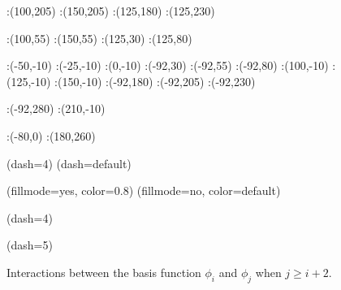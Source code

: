 {\begin{figure}[h]
:(100,205) :(150,205)
:(125,180) :(125,230)

:(100,55) :(150,55)
:(125,30) :(125,80)

:(-50,-10) :(-25,-10) :(0,-10) 
:(-92,30) :(-92,55) :(-92,80) 
:(100,-10) :(125,-10) :(150,-10) 
:(-92,180) :(-92,205) :(-92,230) 

:(-92,280) :(210,-10)


:(-80,0) :(180,260)


\figdrawbegin{}
\figdrawarrow[1,2]
\figdrawarrow[3,4]
\figset(dash=4)
\figdrawline[5,6]
\figdrawline[7,8]
\figdrawline[9,10]
\figdrawline[11,12]
\figdrawline[13,14]
\figdrawline[15,16]
\figdrawline[17,18]
\figdrawline[19,20]
\figdrawline[21,22]
\figdrawline[23,24]
\figdrawline[25,26]
\figdrawline[27,28]
\figset(dash=default)

\figset(fillmode=yes, color=0.8)
\figdrawline[33,34,36,35,33]
\figdrawline[41,42,44,43,41]
\figset (fillmode=no, color=default)
\figdrawline[33,34,36,35,33]
\figdrawline[41,42,44,43,41]

\figset(dash=4)
\figdrawline[45,46]
\figdrawline[47,48]
\figdrawline[49,50]
\figdrawline[51,52]
\figdrawline[53,54]
\figdrawline[55,56]
\figdrawline[57,58]
\figdrawline[59,60]

\figset(dash=5)
\figdrawline[75,76]

\figdrawend

\centerline{\box\figBoxA}
\caption{Interactions between the basis function $\phi_i$ and $\phi_j$ when $j\geq i+2$.}\label{upp_tri}
\end{figure}


}
